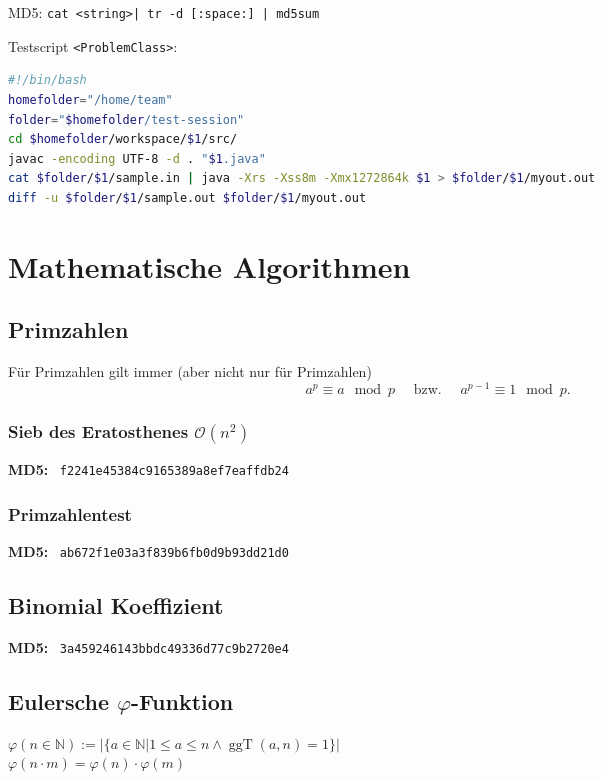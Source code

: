 \documentclass[10pt,a4paper,ngerman,oneside,]{article}
\newcommand{\N}{\ensuremath{\mathbb{N}}}
\newcommand{\ggT}{\ensuremath{\operatorname{ggT}}}
\begin{document}
\begin{multicols}{2}
\thispagestyle{fancy}
\tableofcontents
\vfill
\newcommand{\hash}[1]{{\bfseries MD5:} ~\texttt{#1}}
\vspace{3em}\noindent MD5: \texttt{cat <string>| tr -d [:space:] | md5sum}\\

\par\noindent Testscript \texttt{<ProblemClass>}:
\begin{lstlisting}[language=bash,mathescape=false]
#!/bin/bash
homefolder="/home/team"
folder="$homefolder/test-session"
cd $homefolder/workspace/$1/src/
javac -encoding UTF-8 -d . "$1.java"
cat $folder/$1/sample.in | java -Xrs -Xss8m -Xmx1272864k $1 > $folder/$1/myout.out
diff -u $folder/$1/sample.out $folder/$1/myout.out
\end{lstlisting}
\newpage

\section{Mathematische Algorithmen}
\subsection{Primzahlen}
Für Primzahlen gilt immer (aber nicht nur für Primzahlen)
\[a^p\equiv a\mod p \quad\text{ bzw. }\quad a^{p-1}\equiv 1 \mod p.\]
\subsubsection{Sieb des Eratosthenes $\mathcal O(n^2)$}
\hash{f2241e45384c9165389a8ef7eaffdb24}
\subsubsection{Primzahlentest}
\hash{ab672f1e03a3f839b6fb0d9b93dd21d0}
\subsection{Binomial Koeffizient}
\hash{3a459246143bbdc49336d77c9b2720e4}
\subsection{Eulersche $\varphi$-Funktion}
$\varphi(n\in\N):=|\{a\in\N |1\leq a \leq n \wedge \ggT (a,n)=1\}|$\\
$\varphi(n\cdot m)=\varphi(n)\cdot\varphi(m)$


\end{multicols}
\end{document}
